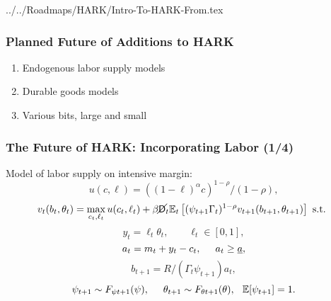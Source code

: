 \documentclass[11ptt]{beamer}
\begin{document}
\begin{verbatimwrite}{../../Roadmaps/HARK/Intro-To-HARK-From.tex}
  \begin{frame}\label{HARKFuture}\frametitle{Planned Future of Additions to HARK}

    \begin{enumerate}
    \item Endogenous labor supply models  \hyperlink{LaborSupply}{}
    \item Durable goods models \hyperlink{DurableGoods}{}
    \item Various bits, large and small \hyperlink{StructuralChanges}{}
    \end{enumerate}
  \end{frame}


  \begin{frame}\label{LaborSupply}
    \frametitle{The Future of HARK: Incorporating Labor (1/4)}
    Model of labor supply on intensive margin:
    \begin{equation*}
      u(c,\ell) = ((1-\ell)^\alpha c)^{1-\rho}/(1-\rho),
    \end{equation*}
    \begin{equation*}
      v_t(b_t,\theta_t) = \max_{c_t, \ell_t} u(c_t,\ell_t) + \beta \cancel{\mathsf{D}}_t \mathbb{E}_t \left[(\psi_{t+1} \Gamma_t)^{1-\rho} v_{t+1}(b_{t+1},\theta_{t+1}) \right] \text{ s.t. }
    \end{equation*}
    \begin{equation*}
      y_t = \ell_t \theta_t, \qquad \ell_t \in [0,1],
    \end{equation*}
    \begin{equation*}
      a_t = m_t + y_t - c_t, \hspace{0.5cm} a_t \geq \underline{a},
    \end{equation*}
    \begin{equation*}
      b_{t+1} = R/(\Gamma_t \psi_{t+1}) a_t, 
    \end{equation*}
    \begin{equation*}
      \psi_{t+1} \sim F_{\psi t+1}(\psi), \hspace{0.5cm} \theta_{t+1} \sim F_{\theta t+1}(\theta), \hspace{0.25cm} \mathbb{E}[\psi_{t+1}] = 1.
    \end{equation*}
  \end{frame}



\end{verbatimwrite}
\end{document}
